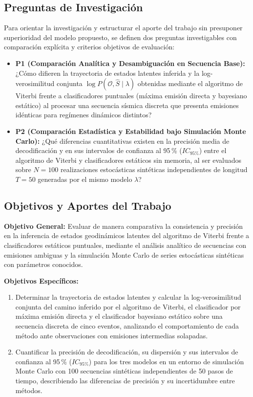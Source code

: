 \documentclass[11pt,a4paper]{article}
\begin{document}
\subsection{Preguntas de Investigación}

Para orientar la investigación y estructurar el aporte del trabajo sin presuponer superioridad del modelo propuesto, se definen dos preguntas investigables con comparación explícita y criterios objetivos de evaluación:

\begin{itemize}
    \item \textbf{P1 (Comparación Analítica y Desambiguación en Secuencia Base):} ¿Cómo difieren la trayectoria de estados latentes inferida y la log-verosimilitud conjunta $\log P(\mathcal{O}, \hat{S} \mid \lambda)$ obtenidas mediante el algoritmo de Viterbi frente a clasificadores puntuales (máxima emisión directa y bayesiano estático) al procesar una secuencia sísmica discreta que presenta emisiones idénticas para regímenes dinámicos distintos?
    \item \textbf{P2 (Comparación Estadística y Estabilidad bajo Simulación Monte Carlo):} ¿Qué diferencias cuantitativas existen en la precisión media de decodificación y en sus intervalos de confianza al 95\,\% ($IC_{95\%}$) entre el algoritmo de Viterbi y clasificadores estáticos sin memoria, al ser evaluados sobre $N = 100$ realizaciones estocásticas sintéticas independientes de longitud $T = 50$ generadas por el mismo modelo $\lambda$?
\end{itemize}

\subsection{Objetivos y Aportes del Trabajo}

\textbf{Objetivo General:} Evaluar de manera comparativa la consistencia y precisión en la inferencia de estados geodinámicos latentes del algoritmo de Viterbi frente a clasificadores estáticos puntuales, mediante el análisis analítico de secuencias con emisiones ambiguas y la simulación Monte Carlo de series estocásticas sintéticas con parámetros conocidos.

\textbf{Objetivos Específicos:}
\begin{enumerate}
    \item Determinar la trayectoria de estados latentes y calcular la log-verosimilitud conjunta del camino inferido por el algoritmo de Viterbi, el clasificador por máxima emisión directa y el clasificador bayesiano estático sobre una secuencia discreta de cinco eventos, analizando el comportamiento de cada método ante observaciones con emisiones intermedias solapadas.
    \item Cuantificar la precisión de decodificación, su dispersión y sus intervalos de confianza al 95\,\% ($IC_{95\%}$) para los tres modelos en un entorno de simulación Monte Carlo con 100 secuencias sintéticas independientes de 50 pasos de tiempo, describiendo las diferencias de precisión y su incertidumbre entre métodos.
\end{enumerate}
\end{document}
